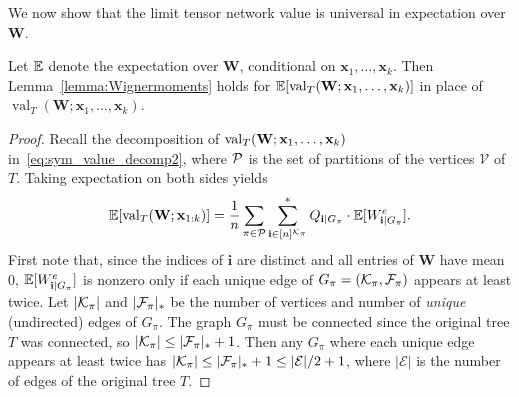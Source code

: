 \documentclass[10pt,reqno]{amsart}
\def\x{\mathbf{x}}
\def\W{\mathbf{W}}
\def\E{\mathbb{E}}
\def\cV{\mathcal{V}}
\def\cE{\mathcal{E}}
\def\val{\operatorname{val}}
\def\bW{{\mathbf{W}}}
\def\bi{\mathbf{i}}
\begin{document}
We now show that the limit tensor network value is universal in
expectation over $\W$.

\begin{lemma}\label{lem:Wignermoments_expected_value}
Let $\mathbb{E}$ denote the expectation over $\W$, conditional on $\x_1,\ldots,\x_k$.
Then Lemma~\ref{lemma:Wignermoments} holds for
$\EE[\val_T(\W;\x_1,\ldots,\x_k)]$ in place of $\val_T(\W;\x_1,\ldots,\x_k)$.
\end{lemma}
\begin{proof}
Recall the decomposition of $\val_T(\bW; \xb_1, \ldots, \xb_k)$
in~\eqref{eq:sym_value_decomp2}, where $\mathcal{P}$ is the set of partitions of the
vertices $\cV$ of $T$. Taking expectation on both sides yields
\begin{equation}\label{eq:Wignerval1}
\EE[\val_T(\bW; \xb_{1:k})]=\frac{1}{n} \sum_{\pi \in \cP}
\sum_{\bi \in [n]^{\cK_\pi}}^* Q_{\bi|G_\pi} \cdot \E[W_{\bi|G_\pi}^e].
\end{equation}
First note that, since the indices of $\bi$ are distinct and all entries of
$\bW$ have mean 0, $\EE[W_{\bi|G_\pi}^e]$ is nonzero only if 
each unique edge of $G_\pi=(\mathcal{K}_\pi,\mathcal{F}_\pi)$ appears at least twice.
Let $|\mathcal{K}_\pi|$ and $|\mathcal{F}_\pi|_*$ be the number of vertices and number
of \emph{unique} (undirected) edges of $G_\pi$. The graph $G_\pi$ must be connected
since the original tree $T$ was connected, so $|\mathcal{K}_\pi| \leq
|\mathcal{F}_\pi|_*+1$. Then any $G_\pi$ where each unique edge appears at least
twice has $|\cK_\pi| \leq |\cF_\pi|_*+1 \leq |\cE|/2+1$,
where $|\cE|$ is the number of edges of the original tree $T$.


\end{proof}
\end{document}
